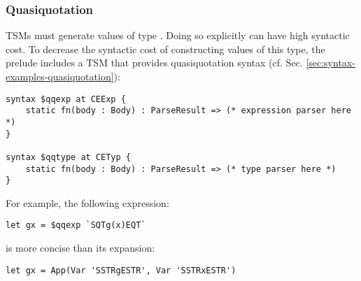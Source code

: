 \subsubsection{Quasiquotation}
TSMs must generate values of type . Doing so explicitly can have high syntactic cost. To decrease the syntactic cost of constructing values of this type, the prelude includes a TSM that provides quasiquotation syntax (cf. Sec. \ref{sec:syntax-examples-quasiquotation}):
\begin{lstlisting}[numbers=none]
syntax $qqexp at CEExp {
	static fn(body : Body) : ParseResult => (* expression parser here *)
}

syntax $qqtype at CETyp {
	static fn(body : Body) : ParseResult => (* type parser here *)
}
\end{lstlisting}
For example, the following expression:
\begin{lstlisting}[numbers=none]
let gx = $qqexp `SQTg(x)EQT`
\end{lstlisting}
is more concise than its expansion:
\begin{lstlisting}[numbers=none]
let gx = App(Var 'SSTRgESTR', Var 'SSTRxESTR')
\end{lstlisting}
